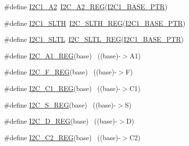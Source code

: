 \begin{DoxyCompactItemize}
\item 
\#define \hyperlink{group___i2_c___register___accessor___macros_gaa4539c51795162a3fccf19384acf78f0}{I2\+C1\+\_\+\+A2}~\hyperlink{group___i2_c___register___accessor___macros_ga01c9da9747989c2d30eac15661d1f5c3}{I2\+C\+\_\+\+A2\+\_\+\+R\+EG}(\hyperlink{group___i2_c___peripheral_gae13da5d584f2a4e2379db927a3f18772}{I2\+C1\+\_\+\+B\+A\+S\+E\+\_\+\+P\+TR})
\item 
\#define \hyperlink{group___i2_c___register___accessor___macros_ga636aa70cc9b9d94328cecb67e0005e7b}{I2\+C1\+\_\+\+S\+L\+TH}~\hyperlink{group___i2_c___register___accessor___macros_gac1a6a43a0292446673c0d1d39cd69e21}{I2\+C\+\_\+\+S\+L\+T\+H\+\_\+\+R\+EG}(\hyperlink{group___i2_c___peripheral_gae13da5d584f2a4e2379db927a3f18772}{I2\+C1\+\_\+\+B\+A\+S\+E\+\_\+\+P\+TR})
\item 
\#define \hyperlink{group___i2_c___register___accessor___macros_ga1d6d67136378cdc43250d350dde35366}{I2\+C1\+\_\+\+S\+L\+TL}~\hyperlink{group___i2_c___register___accessor___macros_gaa9eb90e621e77e8758f4c7f6724b9011}{I2\+C\+\_\+\+S\+L\+T\+L\+\_\+\+R\+EG}(\hyperlink{group___i2_c___peripheral_gae13da5d584f2a4e2379db927a3f18772}{I2\+C1\+\_\+\+B\+A\+S\+E\+\_\+\+P\+TR})
\item 
\#define \hyperlink{group___i2_c___register___accessor___macros_gaf3e90bf855e545f82942bfb9207756a6}{I2\+C\+\_\+\+A1\+\_\+\+R\+EG}(base)                                              ~((base)-\/$>$A1)
\item 
\#define \hyperlink{group___i2_c___register___accessor___macros_ga7aae8ba32e5e505c2db1bbc3b7c20213}{I2\+C\+\_\+\+F\+\_\+\+R\+EG}(base)                                                ~((base)-\/$>$F)
\item 
\#define \hyperlink{group___i2_c___register___accessor___macros_ga339b4af5c87abf62ac1689a412de6253}{I2\+C\+\_\+\+C1\+\_\+\+R\+EG}(base)                                              ~((base)-\/$>$C1)
\item 
\#define \hyperlink{group___i2_c___register___accessor___macros_ga6731d8ddb2a07ae27efc7424ef7fb218}{I2\+C\+\_\+\+S\+\_\+\+R\+EG}(base)                                                ~((base)-\/$>$S)
\item 
\#define \hyperlink{group___i2_c___register___accessor___macros_gae63c8db26394d46c618decb6ce6dbf32}{I2\+C\+\_\+\+D\+\_\+\+R\+EG}(base)                                                ~((base)-\/$>$D)
\item 
\#define \hyperlink{group___i2_c___register___accessor___macros_ga1b1cbd6dd49b0a63bf09270e7be600b3}{I2\+C\+\_\+\+C2\+\_\+\+R\+EG}(base)                                              ~((base)-\/$>$C2)

\end{DoxyCompactItemize}
